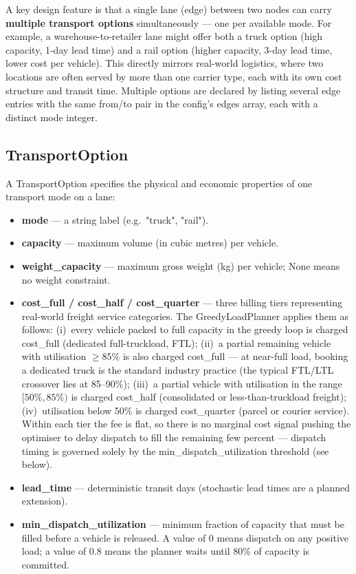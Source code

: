 A key design feature is that a single lane (edge) between two nodes can carry
\textbf{multiple transport options} simultaneously — one per available mode.
For example, a warehouse-to-retailer lane might offer both a truck option
(high capacity, 1-day lead time) and a rail option (higher capacity, 3-day
lead time, lower cost per vehicle).  This directly mirrors real-world
logistics, where two locations are often served by more than one carrier type,
each with its own cost structure and transit time.  Multiple options are
declared by listing several edge entries with the same from/to
pair in the config's edges array, each with a distinct mode
integer.

\subsection{TransportOption}

A TransportOption specifies the physical and economic properties of
one transport mode on a lane:

\begin{itemize}
  \item \textbf{mode} — a string label (e.g.\ "truck", "rail").
  \item \textbf{capacity} — maximum volume (in cubic metres) per vehicle.
  \item \textbf{weight\_capacity} — maximum gross weight (kg) per vehicle;
        None means no weight constraint.
  \item \textbf{cost\_full / cost\_half / cost\_quarter} — three billing
        tiers representing real-world freight service categories.
        The GreedyLoadPlanner applies them as follows:
        (i)~every vehicle packed to full capacity in the greedy loop
        is charged cost\_full (dedicated full-truckload, FTL);
        (ii)~a partial remaining vehicle with utilisation $\geq 85\%$
        is also charged cost\_full — at near-full load, booking a
        dedicated truck is the standard industry practice
        (the typical FTL/LTL crossover lies at 85--90\%);
        (iii)~a partial vehicle with utilisation in the range
        $[50\%, 85\%)$ is charged cost\_half (consolidated or
        less-than-truckload freight);
        (iv)~utilisation below 50\% is charged cost\_quarter
        (parcel or courier service).
        Within each tier the fee is flat, so there is no marginal
        cost signal pushing the optimiser to delay dispatch
        to fill the remaining few percent — dispatch timing
        is governed solely by the min\_dispatch\_utilization
        threshold (see below).
  \item \textbf{lead\_time} — deterministic transit days (stochastic lead times
        are a planned extension).
  \item \textbf{min\_dispatch\_utilization} — minimum fraction of capacity
        that must be filled before a vehicle is released.  A value of 0 means
        dispatch on any positive load; a value of 0.8 means the planner
        waits until 80\% of capacity is committed.
\end{itemize}

